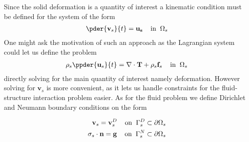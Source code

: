 Since the solid deformation is a quantity of interest a kinematic condition must be defined for the system of the form
\begin{align}
\pder{\mathbf{v}_s}{t} = \mathbf{u_s} \hspace{4mm} \text{in} \hspace{2mm} \Omega_s
\end{align} 
One might ask the motivation of such an approach as the Lagrangian system could let us define the problem 
\begin{align}
\rho_s \ppder{\mathbf{u}_s}{t} = \nabla \cdot \mathbf{T} + \rho_s \mathbf{f}_s
\hspace{4mm} \text{in} \hspace{2mm} \Omega_s
\end{align}
directly solving for the main quantity of interest namely deformation. However solving for $\mathbf{v}_s$ is more convenient, as it lets us handle constraints for the fluid-structure interaction problem easier. As for the fluid problem we define Dirichlet and Neumann boundary conditions on the form

\begin{align*}
\mathbf{v}_s = \mathbf{v}_s^D 
\hspace{4mm} \text{on} \hspace{2mm} \Gamma_s^D \subset \partial \Omega_s  \\
\sigma_s \cdot \mathbf{n} = \mathbf{g}  
\hspace{4mm} \text{on} \hspace{2mm} \Gamma_s^N \subset \partial \Omega_s 
\end{align*}



